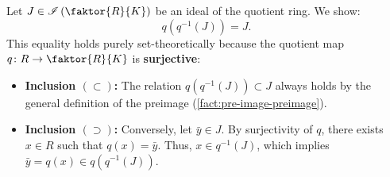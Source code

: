 \begin{proofWrapper}
\begin{content}[Bijective Property Part (A): \texorpdfstring{$q(q^{-1}(J)) = J$}{q(q^{-1}(J)) = J}]
Let $J \in \mathscr{I}\left(\faktor{R}{K}\right)$ be an ideal of the quotient ring. We show:
\begin{equation}\label{eq:composition-step-a}
q(q^{-1}(J)) = J.
\end{equation}
This equality holds purely set-theoretically because the quotient map $q \colon R \to \faktor{R}{K}$ is \textbf{surjective}:
\begin{itemize}
    \item \textbf{Inclusion $(\subset)$:} The relation $q(q^{-1}(J)) \subset J$ always holds by the general definition of the preimage (\cref{fact:pre-image-preimage}).
    \item \textbf{Inclusion $(\supset)$:} Conversely, let $\bar{y} \in J$. By surjectivity of $q$, there exists $x \in R$ such that $q(x) = \bar{y}$. Thus, $x \in q^{-1}(J)$, which implies $\bar{y} = q(x) \in q(q^{-1}(J))$.
\end{itemize}

\begin{center}
\end{center}
\end{content}
\end{proofWrapper}
